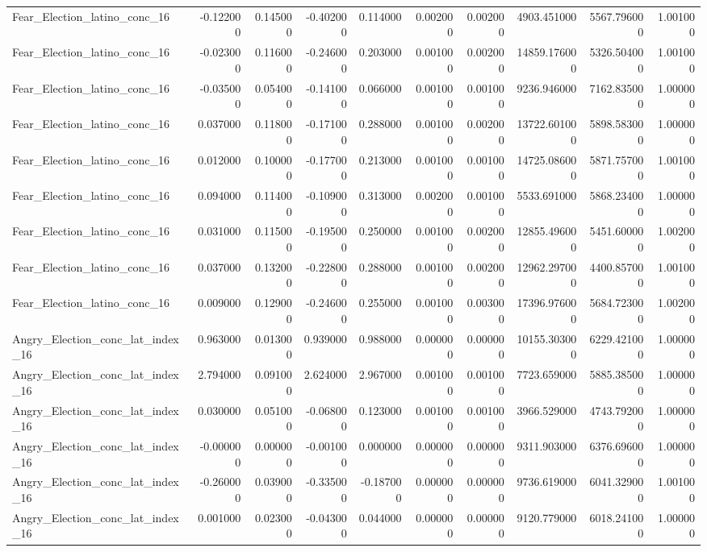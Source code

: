 \begin{table}
\begin{tabular}{lrrrrrrrrr}
Fear_Election_latino_conc_16 & -0.122000 & 0.145000 & -0.402000 & 0.114000 & 0.002000 & 0.002000 & 4903.451000 & 5567.796000 & 1.001000 \\
Fear_Election_latino_conc_16 & -0.023000 & 0.116000 & -0.246000 & 0.203000 & 0.001000 & 0.002000 & 14859.176000 & 5326.504000 & 1.001000 \\
Fear_Election_latino_conc_16 & -0.035000 & 0.054000 & -0.141000 & 0.066000 & 0.001000 & 0.001000 & 9236.946000 & 7162.835000 & 1.000000 \\
Fear_Election_latino_conc_16 & 0.037000 & 0.118000 & -0.171000 & 0.288000 & 0.001000 & 0.002000 & 13722.601000 & 5898.583000 & 1.000000 \\
Fear_Election_latino_conc_16 & 0.012000 & 0.100000 & -0.177000 & 0.213000 & 0.001000 & 0.001000 & 14725.086000 & 5871.757000 & 1.001000 \\
Fear_Election_latino_conc_16 & 0.094000 & 0.114000 & -0.109000 & 0.313000 & 0.002000 & 0.001000 & 5533.691000 & 5868.234000 & 1.000000 \\
Fear_Election_latino_conc_16 & 0.031000 & 0.115000 & -0.195000 & 0.250000 & 0.001000 & 0.002000 & 12855.496000 & 5451.600000 & 1.002000 \\
Fear_Election_latino_conc_16 & 0.037000 & 0.132000 & -0.228000 & 0.288000 & 0.001000 & 0.002000 & 12962.297000 & 4400.857000 & 1.001000 \\
Fear_Election_latino_conc_16 & 0.009000 & 0.129000 & -0.246000 & 0.255000 & 0.001000 & 0.003000 & 17396.976000 & 5684.723000 & 1.002000 \\
Angry_Election_conc_lat_index_16 & 0.963000 & 0.013000 & 0.939000 & 0.988000 & 0.000000 & 0.000000 & 10155.303000 & 6229.421000 & 1.000000 \\
Angry_Election_conc_lat_index_16 & 2.794000 & 0.091000 & 2.624000 & 2.967000 & 0.001000 & 0.001000 & 7723.659000 & 5885.385000 & 1.000000 \\
Angry_Election_conc_lat_index_16 & 0.030000 & 0.051000 & -0.068000 & 0.123000 & 0.001000 & 0.001000 & 3966.529000 & 4743.792000 & 1.000000 \\
Angry_Election_conc_lat_index_16 & -0.000000 & 0.000000 & -0.001000 & 0.000000 & 0.000000 & 0.000000 & 9311.903000 & 6376.696000 & 1.000000 \\
Angry_Election_conc_lat_index_16 & -0.260000 & 0.039000 & -0.335000 & -0.187000 & 0.000000 & 0.000000 & 9736.619000 & 6041.329000 & 1.001000 \\
Angry_Election_conc_lat_index_16 & 0.001000 & 0.023000 & -0.043000 & 0.044000 & 0.000000 & 0.000000 & 9120.779000 & 6018.241000 & 1.000000 \\

\end{tabular}
\end{table}
